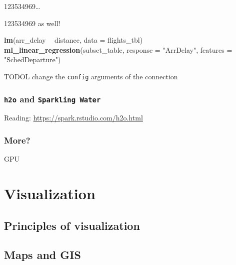 \documentclass[]{book}
\newenvironment{Shaded}{\begin{snugshade}}{\end{snugshade}}
\newcommand{\KeywordTok}[1]{\textcolor[rgb]{0.13,0.29,0.53}{\textbf{#1}}}
\newcommand{\DataTypeTok}[1]{\textcolor[rgb]{0.13,0.29,0.53}{#1}}
\newcommand{\StringTok}[1]{\textcolor[rgb]{0.31,0.60,0.02}{#1}}
\newcommand{\CommentTok}[1]{\textcolor[rgb]{0.56,0.35,0.01}{\textit{#1}}}
\newcommand{\OperatorTok}[1]{\textcolor[rgb]{0.81,0.36,0.00}{\textbf{#1}}}
\newcommand{\NormalTok}[1]{#1}
\theoremstyle{definition}
\theoremstyle{definition}
\theoremstyle{definition}
\theoremstyle{remark}
\begin{document}
123534969\ldots{}

\begin{Shaded}
\end{Shaded}

\begin{Shaded}
\end{Shaded}

123534969 as well!

\begin{Shaded}
\begin{Highlighting}[]
\KeywordTok{lm}\NormalTok{(arr_delay }\OperatorTok{~}\StringTok{ }\NormalTok{distance, }\DataTypeTok{data =}\NormalTok{ flights_tbl)}
\KeywordTok{ml_linear_regression}\NormalTok{(subset_table, }\DataTypeTok{response =} \StringTok{"ArrDelay"}\NormalTok{, }\DataTypeTok{features =} \StringTok{"SchedDeparture"}\NormalTok{)}
\end{Highlighting}
\end{Shaded}

TODOL change the \texttt{config} arguments of the connection

\subsection{\texorpdfstring{\texttt{h2o} and
\texttt{Sparkling\ Water}}{h2o and Sparkling Water}}\label{h2o-and-sparkling-water}

Reading: \url{https://spark.rstudio.com/h2o.html}

\subsection{More?}\label{more}

GPU

\chapter{Visualization}\label{visualization}

\section{Principles of visualization}\label{principles-of-visualization}

\section{Maps and GIS}\label{maps-and-gis}


\end{document}
